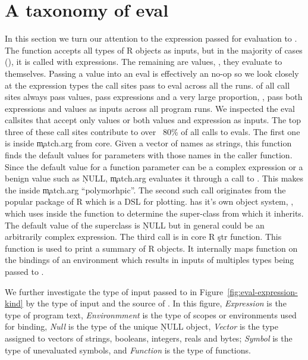 \documentclass[conference]{IEEEtran}
\newcommand{\missingTag}[1]{\textcolor{red}{#1}\xspace}
\begin{document}
\section{A taxonomy of eval}

In this section we turn our attention to the expression passed for evaluation to
\eval. The \eval function accepts all types of R objects as inputs, but in the
majority of cases (\AllExpressionInputEvalCallPerc), it is called with
expressions. The remaining \AllValueInputEvalCallPerc are values, \ie, they
evaluate to themselves.
%
%
Passing a value into an eval is effectively an no-op so we look closely at the
expression types the call sites pass to eval across all the runs.
\AllValueInputEvalSitePerc of all call sites always pass values,
\AllExpressionInputEvalSitePerc pass expressions and a very large proportion,
\AllPolymorphicInputEvalSitePerc, pass both expressions and values as inputs
across all program runs. We inspected the eval callsites that accept only values
or both values and expression as inputs. The top three of these call sites
contribute to over ~80\% of all calls to evals. The first one is inside
\c{match.arg} from core. Given a vector of names as strings, this function finds
the default values for parameters with those names in the caller function. Since
the default value for a function parameter can be a complex expression or a
benign value such as \c{NULL}, \c{match.arg} evaluates it through a call to
\eval. This makes the \eval inside \c{match.arg} ``polymorhpic''. The second
such \eval call originates from the popular \ggplot package of R which is a DSL
for plotting. \ggplot has it's own object system, \ggproto, which uses \eval
inside the \ggproto function to determine the super-class from which it
inherits. The default value of the superclass is \c{NULL} but in general could
be an arbitrarily complex expression. The third \eval call is in core R \c{str}
function. This function is used to print a summary of R objects. It internally
maps \eval function on the bindings of an environment which results in inputs of
multiples types being passed to \eval.

We further investigate the type of input passed to \eval in
Figure~\ref{fig:eval-expression-kind} by the type of input and
the source of \eval. In this figure, \emph{Expression} is the type of program text,
\emph{Environmment} is the type of scopes or environments used for binding,
\emph{Null} is the type of the unique \c{NULL} object, \emph{Vector} is the type
assigned to vectors of strings, booleans, integers, reals and bytes;
\emph{Symbol} is the type of unevaluated symbols, and \emph{Function} is the
type of functions.
\end{document}
